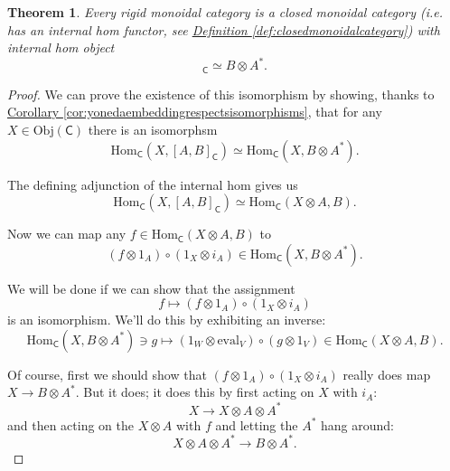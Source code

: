 \documentclass[a4paper,10pt]{scrreprt}
\newcommand{\Obj}{\mathrm{Obj}}
\newcommand{\Hom}{\mathrm{Hom}}
\newcommand{\ev}{\mathrm{eval}}
\theoremstyle{definition}
\theoremstyle{plain}
\newtheorem{theorem}{Theorem}[section]
\theoremstyle{remark}
\begin{document}
\begin{theorem}
  Every rigid monoidal category is a closed monoidal category (i.e. has an internal hom functor, see \hyperref[def:closedmonoidalcategory]{Definition \ref*{def:closedmonoidalcategory}}) with internal hom object 
  \begin{equation*}
    [A, B]_{\mathsf{C}} \simeq B \otimes A^{*}.
  \end{equation*}
\end{theorem}
\begin{proof}
  We can prove the existence of this isomorphism by showing, thanks to \hyperref[cor:yonedaembeddingrespectsisomorphisms]{Corollary \ref*{cor:yonedaembeddingrespectsisomorphisms}}, that for any $X \in \Obj(\mathsf{C})$ there is an isomorphsm
  \begin{equation*}
    \Hom_{\mathsf{C}}(X, [A, B]_{\mathsf{C}}) \simeq \Hom_{\mathsf{C}}(X, B \otimes A^{*}).
  \end{equation*}

  The defining adjunction of the internal hom gives us 
  \begin{equation*}
    \Hom_{\mathsf{C}}(X, [A, B]_{\mathsf{C}}) \simeq \Hom_{\mathsf{C}}(X \otimes A, B).
  \end{equation*}

  Now we can map any $f \in \Hom_{\mathsf{C}}(X \otimes A, B)$ to
  \begin{equation*}
    (f \otimes 1_{A}) \circ (1_{X} \otimes i_{A}) \in \Hom_{\mathsf{C}}(X, B \otimes A^{*}).
  \end{equation*}

  We will be done if we can show that the assignment
  \begin{equation*}
    f \mapsto (f \otimes 1_{A}) \circ (1_{X} \otimes i_{A})
  \end{equation*}
  is an isomorphism. We'll do this by exhibiting an inverse:
  \begin{equation*}
    \Hom_{\mathsf{C}}(X, B \otimes A^{*}) \ni g \mapsto (1_{W} \otimes \ev_{V}) \circ (g \otimes 1_{V}) \in \Hom_{\mathsf{C}}(X \otimes A, B).
  \end{equation*}

  Of course, first we should show that $(f \otimes 1_{A}) \circ (1_{X} \otimes i_{A})$ really does map $X \to B \otimes A^{*}$. But it does; it does this by first acting on $X$ with $i_{A}$:
  \begin{equation*}
    X \to X \otimes A \otimes A^{*}
  \end{equation*}
  and then acting on the $X \otimes A$ with $f$ and letting the $A^{*}$ hang around:
  \begin{equation*}
    X \otimes A \otimes A^{*} \to B \otimes A^{*}.
  \end{equation*}


\end{proof}
\end{document}
